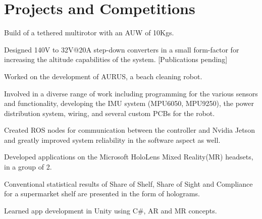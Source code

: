 \documentclass[]{deedy-resume-openfont}
\begin{document}
\hfill
\begin{minipage}[t]{0.66\textwidth} 


\section{Projects and Competitions}

\vspace{\topsep} %
\begin{tightemize}
\item Build of a tethered multirotor with an AUW of 10Kgs.
\item Designed 140V to 32V@20A step-down converters in a small form-factor for increasing the altitude capabilities of the system. [Publications pending]
\end{tightemize}
\sectionsep

\begin{tightemize}
\item Worked on the development of AURUS, a beach cleaning robot.
\item Involved in a diverse range of work including programming for the various sensors and functionality, developing the IMU system (MPU6050, MPU9250), the power distribution system, wiring, and several custom PCBs for the robot.
\item Created ROS nodes for communication between the controller and Nvidia Jetson and greatly improved system reliability in the software aspect as well.
\end{tightemize}
\sectionsep

\begin{tightemize}
	\item Developed applications on the Microsoft HoloLens Mixed Reality(MR) headsets, in a group of 2.
	\item Conventional statistical results of Share of Shelf, Share of Sight and Compliance for a supermarket shelf are presented in the form of holograms.
	\item Learned app development in Unity using C\#, AR and MR concepts.
\end{tightemize}
\sectionsep


\end{minipage}
\end{document}
